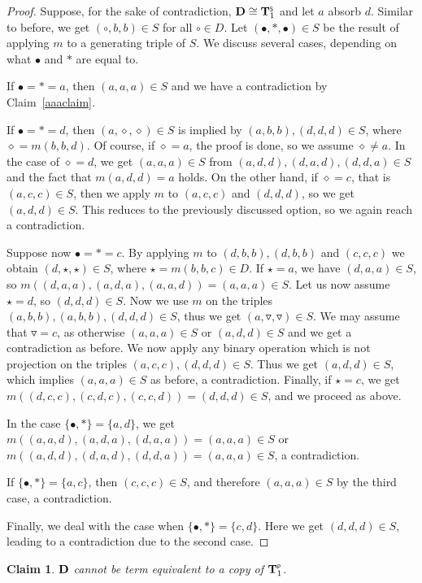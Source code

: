 \documentclass[11pt]{amsart}
\newcommand{\m}[1]{\mathbf{\uppercase{#1}}}
\theoremstyle{definition}
\theoremstyle{remark}
\theoremstyle{plain}
\newtheorem{claim}[thm]{Claim}
\begin{document}
\begin{proof}
Suppose, for the sake of contradiction, $\m d\cong\m t^{\scriptscriptstyle{\mathsf{S}}}_1$ and let $a$ absorb $d$. Similar to before, we get $(\circ,b,b)\in S$ for all $\circ\in D$. Let $(\bullet,\ast,\bullet)\in S$ be the result of applying $m$ to a generating triple of $S$. We discuss several cases, depending on what $\bullet$ and $\ast$ are equal to. 

If $\bullet=\ast=a$, then $(a,a,a)\in S$ and we have a contradiction by Claim~\ref{aaaclaim}.


If $\bullet=\ast=d$, then $(a,\diamond,\diamond)\in S$ is implied by $(a,b,b),(d,d,d)\in S$,  where $\diamond=m(b,b,d)$. Of course, if $\diamond=a$, the proof is done, so we assume $\diamond\neq a$. In the case of $\diamond=d$, we get $(a,a,a)\in S$ from $(a,d,d),(d,a,d),(d,d,a)\in S$ and the fact that $m(a,d,d)=a$ holds. On the other hand, if $\diamond=c$, that is $(a,c,c)\in S$, then we apply $m$ to $(a,c,c)$ and $(d,d,d)$, so we get $(a,d,d)\in S$. This reduces to the previously discussed option, so we again reach a contradiction.

Suppose now $\bullet=\ast=c$. By applying $m$ to $(d,b,b),(d,b,b)$ and $(c,c,c)$ we obtain $(d,\star,\star)\in S$, where $\star=m(b,b,c)\in D$. If $\star=a$, we have $(d,a,a)\in S$, so $m((d,a,a),(a,d,a),(a,a,d))=(a,a,a)\in S$. Let us now assume $\star=d$, so $(d,d,d)\in S$. Now we use $m$ on the triples $(a,b,b),(a,b,b),(d,d,d)\in S$, thus we get $(a,\triangledown,\triangledown)\in S$. We may assume that $\triangledown=c$, as otherwise $(a,a,a)\in S$ or $(a,d,d)\in S$ and we get a contradiction as before. We now apply any binary operation which is not projection on the triples $(a,c,c),(d,d,d)\in S$. Thus we get $(a,d,d)\in S$, which implies $(a,a,a)\in S$ as before, a contradiction. Finally, if $\star=c$, we get $m((d,c,c),(c,d,c),(c,c,d))=(d,d,d)\in S$, and we proceed as above.

In the case $\{\bullet,\ast\}=\{a,d\}$, we get $m((a,a,d),(a,d,a),(d,a,a))=(a,a,a)\in S$ or $m((a,d,d),(d,a,d),(d,d,a))=(a,a,a)\in S$, a contradiction.

If $\{\bullet,\ast\}=\{a,c\}$, then $(c,c,c)\in S$, and therefore $(a,a,a)\in S$ by the third case, a contradiction.

Finally, we deal with the case when $\{\bullet,\ast\}=\{c,d\}$. Here we get $(d,d,d)\in S$, leading to a contradiction due to the second case.
\end{proof}

\begin{claim}
$\m d$ cannot be term equivalent to a copy of $\m t_1^{\scriptscriptstyle{\mathsf{P}}}$.  
\end{claim}
\end{document}
